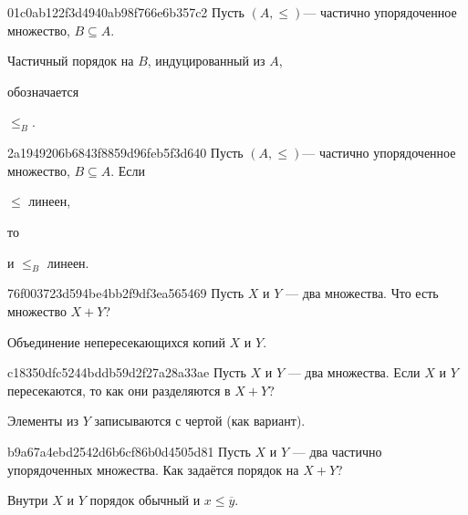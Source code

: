 \begin{note}{01c0ab122f3d4940ab98f766e6b357c2}
    Пусть \({ (A, \leqslant) }\)--- частично упорядоченное множество, \({ B \subseteq A }\).
    \begin{icloze}{2}Частичный порядок на \({ B }\), индуцированный из \({ A }\),\end{icloze} обозначается \begin{icloze}{1}\({ \leqslant_{B} }\).\end{icloze}
\end{note}

\begin{note}{2a1949206b6843f8859d96feb5f3d640}
    Пусть \({ (A, \leqslant) }\)--- частично упорядоченное множество, \({ B \subseteq A }\).
    Если \begin{icloze}{2}\({ \leqslant }\) линеен,\end{icloze} то \begin{icloze}{1}и \({ \leqslant_{B} }\) линеен.\end{icloze}
\end{note}

\begin{note}{76f003723d594be4bb2f9df3ea565469}
    Пусть \({ X }\) и \({ Y }\) --- два множества.
    Что есть множество \({ X + Y }\)?

    \begin{cloze}{1}
        Объединение непересекающихся копий \({ X }\) и \({ Y }\).
    \end{cloze}
\end{note}

\begin{note}{c18350dfc5244bddb59d2f27a28a33ae}
    Пусть \({ X }\) и \({ Y }\) --- два множества.
    Если \({ X }\) и \({ Y }\) пересекаются, то как они разделяются в \({ X + Y }\)?

    \begin{cloze}{1}
        Элементы из \({ Y }\) записываются с чертой (как вариант).
    \end{cloze}
\end{note}

\begin{note}{b9a67a4ebd2542d6b6cf86b0d4505d81}
    Пусть \({ X }\) и \({ Y }\) --- два частично упорядоченных множества.
    Как задаётся порядок на \({ X + Y }\)?

    \begin{cloze}{1}
        Внутри \({ X }\) и \({ Y }\) порядок обычный и \({ x \leqslant \overline{y} }\).
    \end{cloze}
\end{note}

